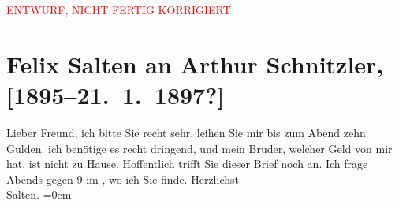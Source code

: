 
\begin{center}
            \textcolor{red}{ENTWURF, NICHT FERTIG KORRIGIERT}
                      \end{center}
            
         
         \renewcommand{\erwaehntePersonen}{Personen: Michael Emil Salzmann}
         \renewcommand{\erwaehnteOrte}{Orte: Café Griensteidl, Wien}
         \renewcommand{\erwaehnteWerke}{}
               \section[Felix Salten an Arthur Schnitzler, {[}1895–21. 1. 1897?{]}]{ Felix Salten an Arthur Schnitzler,
               {[}1895–21. 1. 1897?{]}}\nopagebreak{}\rehead{ }\begin{ledgroupsized}[t]{13cm}\normalsize\beginnumbering \toendnotes[C]{\smallbreak\pagebreak[2]} 
\toendnotes[C]{\smallbreak}\pstart
           \noindent{}{\pb}Lieber Freund, ich bitte Sie recht sehr, leihen Sie mir bis zum
               Abend zehn Gulden. ich benötige es recht dringend, und mein Bruder, welcher Geld von mir
               hat, ist nicht zu Hause. \pend
           \pstart
           Hoffentlich trifft Sie dieser Brief noch an. Ich frage Abends gegen 9 im
                  \label{K_L03182-1v}\label{K_L03182-1h}, wo ich Sie finde. \pend
           \pstart
           Herzlichst {\\[\baselineskip]}\spacefill\mbox{Salten.}\pend
           \leftskip=0em{}
         
         \endnumbering{}\end{ledgroupsized}\begin{anhang}\end{anhang}\newcommand{\dateiname}{L03182}\newcommand{\titel}{Felix Salten an Arthur Schnitzler, [1895–21. 1. 1897?]}\newcommand{\editorInnen}{Martin Anton Müller und Laura Untner}
      